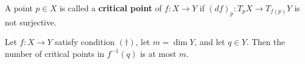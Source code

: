 %

A point $p \in X$ is called a \textbf{critical point} of $f: X \to Y$ if
$(df)_p: T_pX \to T_{f(p)}Y$ is not surjective.

\begin{lemma}
Let $f: X \to Y$ satisfy condition $(\dagger)$, let $m = \dim Y$, and let $q \in Y$.
Then the number of critical points in $f^{-1}(q)$ is at most $m$.
\end{lemma}
